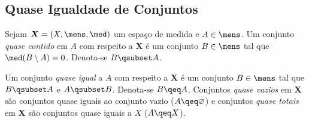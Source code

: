 \subsection{Quase Igualdade de Conjuntos}

\begin{defi}
Sejam $\bm X=(X,\mens,\med)$ um espaço de medida e $A \in \mens$. Um conjunto \emph{quase contido} em $A$ com respeito a $\bm X$ é um conjunto $B \in \mens$ tal que $\med(B \setminus A) = 0$. Denota-se $B \qsubset A$.

Um conjunto \emph{quase igual} a $A$ com respeito a $\bm X$ é um conjunto $B \in \mens$ tal que $B \qsubset A$ e $A \qsubset B$. Denota-se $B \qeq A$. Conjuntos \emph{quase vazios} em $\bm X$ são conjuntos quase iguais ao conjunto vazio ($A \qeq \emptyset$) e conjuntos \emph{quase totais} em $\bm X$ são conjuntos quase iguais a $X$ ($A \qeq X$).

\end{defi}

